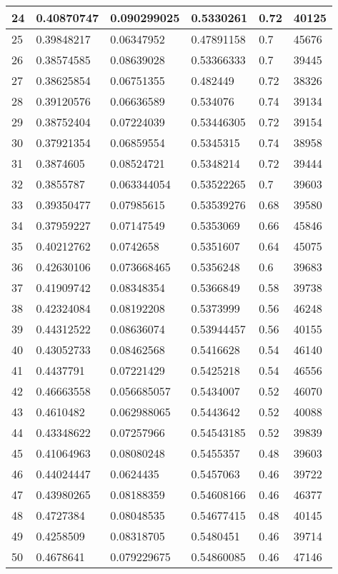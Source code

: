 \begin{longtable}{|l|l|l|l|l|l|}
24 & 0.40870747 & 0.090299025 & 0.5330261 & 0.72 & 40125 \\ \hline 
25 & 0.39848217 & 0.06347952 & 0.47891158 & 0.7 & 45676 \\ \hline 
26 & 0.38574585 & 0.08639028 & 0.53366333 & 0.7 & 39445 \\ \hline 
27 & 0.38625854 & 0.06751355 & 0.482449 & 0.72 & 38326 \\ \hline 
28 & 0.39120576 & 0.06636589 & 0.534076 & 0.74 & 39134 \\ \hline 
29 & 0.38752404 & 0.07224039 & 0.53446305 & 0.72 & 39154 \\ \hline 
30 & 0.37921354 & 0.06859554 & 0.5345315 & 0.74 & 38958 \\ \hline 
31 & 0.3874605 & 0.08524721 & 0.5348214 & 0.72 & 39444 \\ \hline 
32 & 0.3855787 & 0.063344054 & 0.53522265 & 0.7 & 39603 \\ \hline 
33 & 0.39350477 & 0.07985615 & 0.53539276 & 0.68 & 39580 \\ \hline 
34 & 0.37959227 & 0.07147549 & 0.5353069 & 0.66 & 45846 \\ \hline 
35 & 0.40212762 & 0.0742658 & 0.5351607 & 0.64 & 45075 \\ \hline 
36 & 0.42630106 & 0.073668465 & 0.5356248 & 0.6 & 39683 \\ \hline 
37 & 0.41909742 & 0.08348354 & 0.5366849 & 0.58 & 39738 \\ \hline 
38 & 0.42324084 & 0.08192208 & 0.5373999 & 0.56 & 46248 \\ \hline 
39 & 0.44312522 & 0.08636074 & 0.53944457 & 0.56 & 40155 \\ \hline 
40 & 0.43052733 & 0.08462568 & 0.5416628 & 0.54 & 46140 \\ \hline 
41 & 0.4437791 & 0.07221429 & 0.5425218 & 0.54 & 46556 \\ \hline 
42 & 0.46663558 & 0.056685057 & 0.5434007 & 0.52 & 46070 \\ \hline 
43 & 0.4610482 & 0.062988065 & 0.5443642 & 0.52 & 40088 \\ \hline 
44 & 0.43348622 & 0.07257966 & 0.54543185 & 0.52 & 39839 \\ \hline 
45 & 0.41064963 & 0.08080248 & 0.5455357 & 0.48 & 39603 \\ \hline 
46 & 0.44024447 & 0.0624435 & 0.5457063 & 0.46 & 39722 \\ \hline 
47 & 0.43980265 & 0.08188359 & 0.54608166 & 0.46 & 46377 \\ \hline 
48 & 0.4727384 & 0.08048535 & 0.54677415 & 0.48 & 40145 \\ \hline 
49 & 0.4258509 & 0.08318705 & 0.5480451 & 0.46 & 39714 \\ \hline 
50 & 0.4678641 & 0.079229675 & 0.54860085 & 0.46 & 47146 \\ \hline 
\end{longtable}